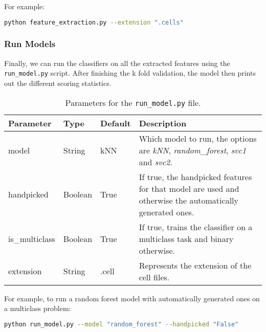 \noindent
For example:
\begin{lstlisting}[language=Bash]
python feature_extraction.py --extension ".cells"
\end{lstlisting}

\subsubsection{Run Models}

Finally, we can run the classifiers on all the extracted features using the \texttt{run\_model.py} script.
After finishing the k fold validation, the model then prints out the different scoring statistics.

\begin{table}[ht]
  \centering
  \begin{tabular}{ l | l | l | p{} }
    \textbf{Parameter} & \textbf{Type} & \textbf{Default} & \textbf{Description} \\ \hline \hline
    model & String & kNN & Which model to run, the options are \textit{kNN}, \textit{random\_forest}, \textit{svc1} and \textit{svc2}. \\ \hline
    handpicked & Boolean & True & If true, the handpicked features for that model are used and otherwise the automatically generated ones. \\ \hline
    is\_multiclass & Boolean & True & If true, trains the classifier on a multiclass task and binary otherwise. \\ \hline
    extension & String & .cell & Represents the extension of the cell files.
  \end{tabular}
  \caption{Parameters for the \texttt{run\_model.py} file.}
\end{table}

\noindent
For example, to run a random forest model with automatically generated ones on a multiclass problem:
\begin{lstlisting}[language=Bash]
python run_model.py --model "random_forest" --handpicked "False"
\end{lstlisting}

\endgroup

